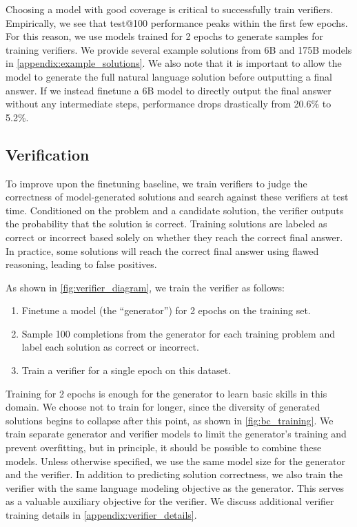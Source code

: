 Choosing a model with good coverage is critical to successfully train verifiers. Empirically, we see that test@100 performance peaks within the first few epochs. For this reason, we use models trained for 2 epochs to generate samples for training verifiers. We provide several example solutions from 6B and 175B models in \ref{appendix:example_solutions}. We also note that it is important to allow the model to generate the full natural language solution before outputting a final answer. If we instead finetune a 6B model to directly output the final answer without any intermediate steps, performance drops drastically from 20.6\% to 5.2\%.

\subsection{Verification} \label{section:verification}

To improve upon the finetuning baseline, we train verifiers to judge the correctness of model-generated solutions and search against these verifiers at test time. Conditioned on the problem and a candidate solution, the verifier outputs the probability that the solution is correct. Training solutions are labeled as correct or incorrect based solely on whether they reach the correct final answer. In practice, some solutions will reach the correct final answer using flawed reasoning, leading to false positives.

As shown in \ref{fig:verifier_diagram}, we train the verifier as follows:

\begin{enumerate}
\item Finetune a model (the “generator”) for 2 epochs on the training set.
\item Sample 100 completions from the generator for each training problem and label each solution as correct or incorrect.
\item Train a verifier for a single epoch on this dataset.
\end{enumerate}

Training for 2 epochs is enough for the generator to learn basic skills in this domain. We choose not to train for longer, since the diversity of generated solutions begins to collapse after this point, as shown in \ref{fig:bc_training}. We train separate generator and verifier models to limit the generator's training and prevent overfitting, but in principle, it should be possible to combine these models. Unless otherwise specified, we use the same model size for the generator and the verifier. In addition to predicting solution correctness, we also train the verifier with the same language modeling objective as the generator. This serves as a valuable auxiliary objective for the verifier. We discuss additional verifier training details in \ref{appendix:verifier_details}.


